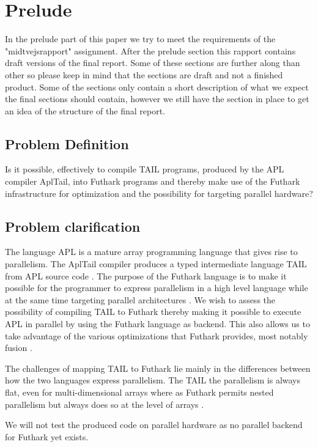 \documentclass[11pt]{article}
\begin{document}
\section{Prelude}

In the prelude part of this paper we try to meet the requirements of the "midtvejsrapport" assignment.
After the prelude section this rapport contains draft versions of the final report. Some of these sections are further
along than other so please keep in mind that the sections are draft and not a finished product.
Some of the sections only contain a short description of what we expect the final sections should contain, however we still have
the section in place to get an idea of the structure of the final report.  

\subsection{Problem Definition}
Is it possible, effectively to compile TAIL programs, produced by the APL compiler AplTail,
into Futhark programs and thereby make use of the Futhark infrastructure for optimization
and the possibility for targeting parallel hardware?

\subsection{Problem clarification}
The language APL is a mature array programming language that gives rise to parallelism.
The AplTail compiler produces a typed intermediate language TAIL from APL source code \cite{ElsmanDybdal:Array:2014}.
The purpose of the Futhark language is to make it possible for the programmer to express parallelism in a high level language
while at the same time targeting parallel architectures \cite{TroelsHenriksen}.
We wish to assess the possibility of compiling TAIL to Futhark thereby making it possible to execute APL in parallel
by using the Futhark language as backend.
This also allows us to take advantage of the various optimizations that Futhark provides, most notably fusion \cite{TroelsHenriksen}.

The challenges of mapping TAIL to Futhark lie mainly in the differences between how the two languages express parallelism.
The TAIL the parallelism is always flat, even for multi-dimensional arrays where as Futhark permits nested parallelism but always
does so at the level of arrays\cite{ElsmanDybdal:Array:2014} \cite{TroelsHenriksen}.

We will not test the produced code on parallel hardware as no parallel backend for Futhark yet exists.
\end{document}

